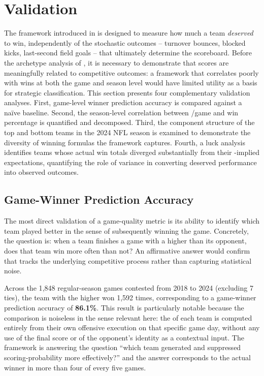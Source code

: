 \section{\gds{} Validation}
\label{sec:gds-validation}

The \gds{} framework introduced in  is designed to measure
how much a team \emph{deserved} to win, independently of the stochastic
outcomes -- turnover bounces, blocked kicks, last-second field goals -- that
ultimately determine the scoreboard. Before the archetype analysis of
, it is necessary to demonstrate that \gds{}
scores are meaningfully related to competitive outcomes: a framework that
correlates poorly with wins at both the game and season level would have
limited utility as a basis for strategic classification. This section presents
four complementary validation analyses. First, game-level winner prediction
accuracy is compared against a na\"{i}ve baseline. Second, the season-level
correlation between \gds{}/game and win percentage is quantified and
decomposed. Third, the component structure of the top and bottom teams in the
2024 NFL season is examined to demonstrate the diversity of winning formulas
the framework captures. Fourth, a luck analysis identifies teams whose actual
win totals diverged substantially from their \gds{}-implied expectations,
quantifying the role of variance in converting deserved performance into
observed outcomes.

\subsection{Game-Winner Prediction Accuracy}
\label{sec:game-winner-prediction}

The most direct validation of a game-quality metric is its ability to identify
which team played better in the sense of subsequently winning the game.
Concretely, the question is: when a team finishes a game with a higher \gds{}
than its opponent, does that team win more often than not? An affirmative answer
would confirm that \gds{} tracks the underlying competitive process rather than
capturing statistical noise.

Across the 1{,}848 regular-season games contested from 2018 to 2024 (excluding
7 ties), the team with the higher \gds{} won 1{,}592 times, corresponding to a
game-winner prediction accuracy of \textbf{86.1\%}. This result is particularly notable
because the comparison is noiseless in the sense relevant here: the \gds{} of
each team is computed entirely from their own offensive execution on that
specific game day, without any use of the final score or of the opponent's
identity as a contextual input. The framework is answering the question ``which
team generated and suppressed scoring-probability more effectively?'' and the
answer corresponds to the actual winner in more than four of every five games.

